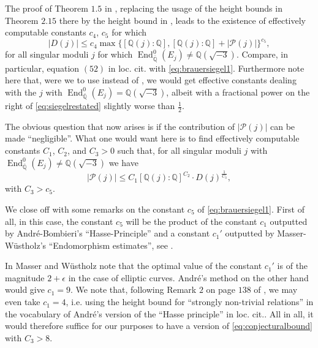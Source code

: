 \documentclass[12pt,twoside,a4paper]{article}
\theoremstyle{plain}%
\DeclareMathOperator{\End}{End}
\newcommand{\Q}{\mathbb{Q}}
\newcommand{\CP}{\mathcal{P}}
\begin{document}
The proof of Theorem $1.5$ in \cite{papaseffbrsieg}, replacing the usage of the height bounds in Theorem $2.15$ there by the height bound in , leads to the existence of effectively computable constants $c_4$, $c_5$ for which 
\begin{equation}\label{eq:brauersiegel1}
	|D(j)|\leq c_4\max\{[\Q(j):\Q],[\Q(j):\Q]+|\CP(j)|\}^{c_5},
\end{equation}for all singular moduli $j$ for which $\End^{0}_{\bar{\Q}}(E_j)\neq \Q(\sqrt{-3})$. Compare, in particular, equation $(52)$ in loc. cit. with \eqref{eq:brauersiegel1}. Furthermore note here that, were we to use  instead of , we would get effective constants dealing with the $j$ with $\End^{0}_{\bar{\Q}}(E_j)=\Q(\sqrt{-3})$, albeit with a fractional power on the right of \eqref{eq:siegelrestated} slightly worse than $\frac{1}{2}$.

The obvious question that now arises is if the contribution of $|\CP(j)|$ can be made ``negligible''. What one would want here is to find effectively computable constants $C_{1}$, $C_2$, and $C_3>0$ such that, for all singular moduli $j$ with $\End^{0}_{\bar{\Q}}(E_j)\neq \Q(\sqrt{-3})$ we have
	\begin{equation}\label{eq:conjecturalbound}
		|\CP(j)|\leq C_{1}[\Q(j):\Q]^{C_2}\cdot D(j)^{\frac{1}{C_3}},\end{equation}with $C_3>c_5$.


We close off with some remarks on the constant $c_5$ of \eqref{eq:brauersiegel1}. First of all, in this case, the constant $c_5$ will be the product of the constant $c_1$ outputted by Andr\'e-Bombieri's ``Hasse-Principle'' and a constant $c_1'$ outputted by Masser-W\"ustholz's ``Endomorphism estimates'', see \cite{mwendoesti}.

In \cite{mwendoesti} Masser and W\"ustholz note that the optimal value of the constant $c_1'$ is of the magnitude $2+\epsilon$ in the case of elliptic curves. Andr\'e's method on the other hand would give $c_1=9$. We note that, following Remark $2$ on page $138$ of \cite{andre1989g}, we may even take $c_1=4$, i.e. using the height bound for ``strongly non-trivial relations'' in the vocabulary of Andr\'e's version of the ``Hasse principle'' in loc. cit.. All in all, it would therefore suffice for our purposes to have a version of \eqref{eq:conjecturalbound} with $C_3>8$.
\end{document}
